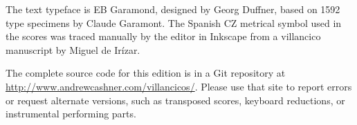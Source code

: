 The text typeface is EB Garamond, designed by Georg Duffner, based on 1592 type 
specimens by Claude Garamont.
The Spanish CZ metrical symbol used in the scores was traced manually by the
editor in Inkscape from a villancico manuscript by Miguel de Irízar.

The complete source code for this edition is in a Git repository at
\url{http://www.andrewcashner.com/villancicos/}.
Please use that site to report errors or request alternate versions, such as
transposed scores, keyboard reductions, or instrumental performing parts.


